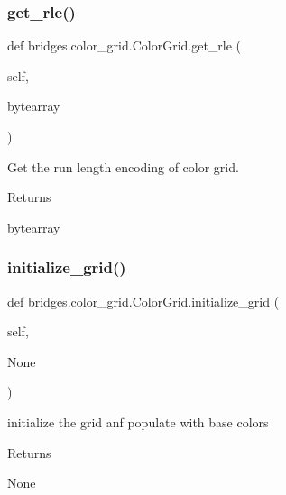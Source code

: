 \subsubsection{\texorpdfstring{get\+\_\+rle()}{get\_rle()}}
{\footnotesize\ttfamily def bridges.\+color\+\_\+grid.\+Color\+Grid.\+get\+\_\+rle (\begin{DoxyParamCaption}\item[{}]{self,  }\item[{}]{bytearray }\end{DoxyParamCaption})}



Get the run length encoding of color grid. 

\begin{DoxyReturn}{Returns}


bytearray 
\end{DoxyReturn}
\mbox{\label{classbridges_1_1color__grid_1_1_color_grid_ad2b3ab19751cbf629096a25e31bb7f42}} 
\subsubsection{\texorpdfstring{initialize\+\_\+grid()}{initialize\_grid()}}
{\footnotesize\ttfamily def bridges.\+color\+\_\+grid.\+Color\+Grid.\+initialize\+\_\+grid (\begin{DoxyParamCaption}\item[{}]{self,  }\item[{}]{None }\end{DoxyParamCaption})}



initialize the grid anf populate with base colors 

\begin{DoxyReturn}{Returns}


None 
\end{DoxyReturn}
\mbox{\label{classbridges_1_1color__grid_1_1_color_grid_a746dde66b828253bd0dfb32c906729fe}} 
